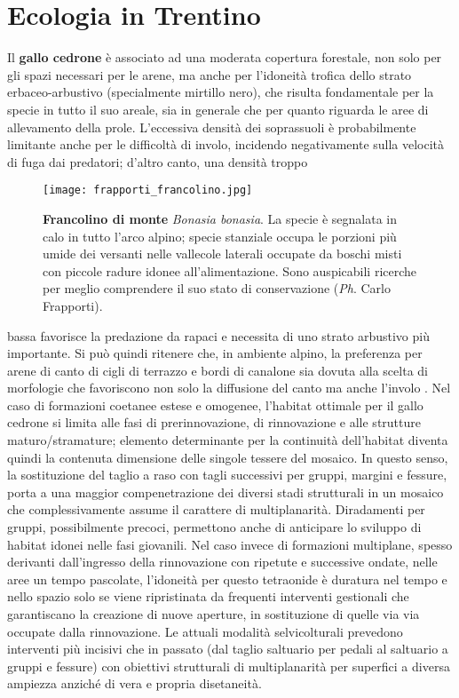 \documentclass[10pt,twoside,openany,x11names,svgnames,italian,a5paper,dvipsnames,table]{memoir}
\newcommand{\ph}{\emph{Ph}. }
\begin{document}
\section{Ecologia in Trentino}
Il \textbf{gallo cedrone} è associato ad una moderata copertura forestale, non solo per gli spazi necessari per le arene, ma anche per l’idoneità trofica dello strato erbaceo-arbustivo (specialmente mirtillo nero), che risulta fondamentale per la specie in tutto il suo areale, sia in generale che per quanto riguarda le aree di allevamento della prole. L’eccessiva densità dei soprassuoli è probabilmente limitante anche per le difficoltà di involo, incidendo negativamente sulla velocità di fuga dai predatori; d’altro canto, una densità troppo 
\begin{wrapfigure}{r}{.5\columnwidth}
\centering
  \texttt{[image: frapporti\_francolino.jpg]}
  \caption*{\textbf{Francolino di monte} \emph{Bonasia bonasia}. La specie è segnalata in calo in tutto l’arco alpino; specie stanziale occupa le porzioni più umide dei versanti nelle vallecole laterali occupate da boschi misti con piccole radure idonee all’alimentazione. Sono auspicabili ricerche per meglio comprendere il suo stato di conservazione (\ph Carlo Frapporti).}
\end{wrapfigure}bassa favorisce la predazione da rapaci e necessita di uno strato arbustivo più importante. Si può quindi ritenere che, in ambiente alpino, la preferenza per arene di canto di cigli di terrazzo e bordi di canalone sia dovuta alla scelta di morfologie che favoriscono non solo la diffusione del canto ma anche l’involo \cite{Angeli07}. Nel caso di formazioni coetanee estese e omogenee, l’habitat ottimale per il gallo cedrone si limita alle fasi di prerinnovazione, di rinnovazione e alle strutture maturo/stramature; elemento determinante per la continuità dell’habitat diventa quindi la contenuta dimensione delle singole tessere del mosaico. In questo senso, la sostituzione del taglio a raso con tagli successivi per gruppi, margini e fessure, porta a una maggior compenetrazione dei diversi stadi strutturali in un mosaico che complessivamente assume il carattere di multiplanarità. Diradamenti 
per gruppi, possibilmente precoci, permettono anche di anticipare lo sviluppo di habitat idonei nelle fasi giovanili. Nel caso invece di formazioni multiplane, spesso derivanti dall’ingresso della rinnovazione con ripetute e successive ondate, nelle aree un tempo pascolate, l’idoneità per questo tetraonide è duratura nel tempo e nello spazio solo se viene ripristinata da frequenti interventi gestionali che garantiscano la creazione di nuove aperture, in sostituzione di quelle via via occupate dalla rinnovazione. Le attuali modalità selvicolturali prevedono interventi più incisivi che in passato (dal taglio saltuario per pedali al saltuario a gruppi e fessure) con obiettivi strutturali di multiplanarità per superfici a diversa ampiezza anziché di vera e propria disetaneità.
\end{document}
